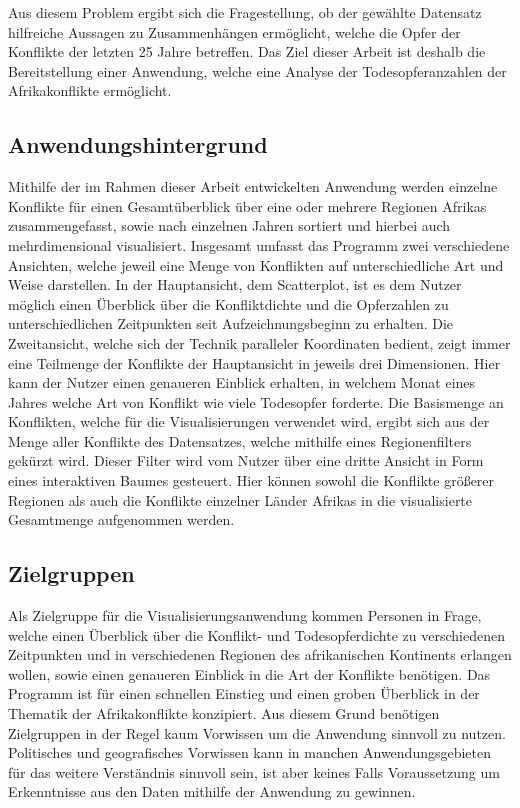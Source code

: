 \documentclass[usegeometry=true]{scrartcl}
\begin{document}
Aus diesem Problem ergibt sich die Fragestellung, ob der gewählte Datensatz hilfreiche Aussagen zu Zusammenhängen ermöglicht, welche die Opfer der Konflikte der letzten 25 Jahre betreffen. Das Ziel dieser Arbeit ist deshalb die Bereitstellung einer Anwendung, welche eine Analyse der Todesopferanzahlen der Afrikakonflikte ermöglicht.

\subsection{Anwendungshintergrund}
Mithilfe der im Rahmen dieser Arbeit entwickelten Anwendung werden einzelne Konflikte für einen Gesamtüberblick über eine oder mehrere Regionen Afrikas zusammengefasst, sowie nach einzelnen Jahren sortiert und hierbei auch mehrdimensional visualisiert. Insgesamt umfasst das Programm zwei verschiedene Ansichten, welche jeweil eine Menge von Konflikten auf unterschiedliche Art und Weise darstellen. In der Hauptansicht, dem Scatterplot, ist es dem Nutzer möglich einen Überblick über die Konfliktdichte und die Opferzahlen zu unterschiedlichen Zeitpunkten seit Aufzeichnungsbeginn zu erhalten. Die Zweitansicht, welche sich der Technik paralleler Koordinaten bedient, zeigt immer eine Teilmenge der Konflikte der Hauptansicht in jeweils drei Dimensionen. Hier kann der Nutzer einen genaueren Einblick erhalten, in welchem Monat eines Jahres welche Art von Konflikt wie viele Todesopfer forderte. Die Basismenge an Konflikten, welche für die Visualisierungen verwendet wird, ergibt sich aus der Menge aller Konflikte des Datensatzes, welche mithilfe eines Regionenfilters gekürzt wird. Dieser Filter wird vom Nutzer über eine dritte Ansicht in Form eines interaktiven Baumes gesteuert. Hier können sowohl die Konflikte größerer Regionen als auch die Konflikte einzelner Länder Afrikas in die visualisierte Gesamtmenge aufgenommen werden.

\subsection{Zielgruppen}
Als Zielgruppe für die Visualisierungsanwendung kommen Personen in Frage, welche einen Überblick über die Konflikt- und Todesopferdichte zu verschiedenen Zeitpunkten und in verschiedenen Regionen des afrikanischen Kontinents erlangen wollen, sowie einen genaueren Einblick in die Art der Konflikte benötigen. Das Programm ist für einen schnellen Einstieg und einen groben Überblick in der Thematik der Afrikakonflikte konzipiert. Aus diesem Grund benötigen Zielgruppen in der Regel kaum Vorwissen um die Anwendung sinnvoll zu nutzen. Politisches und geografisches Vorwissen kann in manchen Anwendungsgebieten für das weitere Verständnis sinnvoll sein, ist aber keines Falls Voraussetzung um Erkenntnisse aus den Daten mithilfe der Anwendung zu gewinnen.\\
\end{document}
